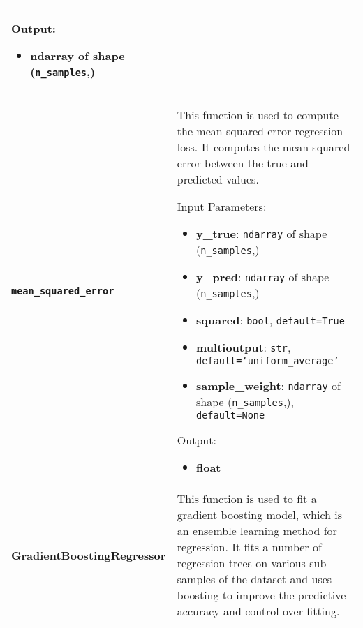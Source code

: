 \begin{longtable}{|l|p{12cm}|}
	Output:
	\begin{itemize}
		\item \textbf{ndarray} of shape (\texttt{n\_samples},)
	\end{itemize} \\*
	\hline
	\textbf{\texttt{mean\_squared\_error}} &
	This function is used to compute the mean squared error regression loss. It computes the mean squared error between the true and predicted values.

	Input Parameters:
	\begin{itemize}
		\item \textbf{y\_true}: \texttt{ndarray} of shape (\texttt{n\_samples},)
		\item \textbf{y\_pred}: \texttt{ndarray} of shape (\texttt{n\_samples},)
		\item \textbf{squared}: \texttt{bool}, \texttt{default=True}
		\item \textbf{multioutput}: \texttt{str}, \texttt{default=`uniform\_average'}
		\item \textbf{sample\_weight}: \texttt{ndarray} of shape (\texttt{n\_samples},), \texttt{default=None}
	\end{itemize}

	Output:
	\begin{itemize}
		\item \textbf{float}
	\end{itemize} \\*
	\hline
	\textbf{GradientBoostingRegressor} &
	This function is used to fit a gradient boosting model, which is an ensemble learning method for regression. It fits a number of regression trees on various sub-samples of the dataset and uses boosting to improve the predictive accuracy and control over-fitting.


\end{longtable}
